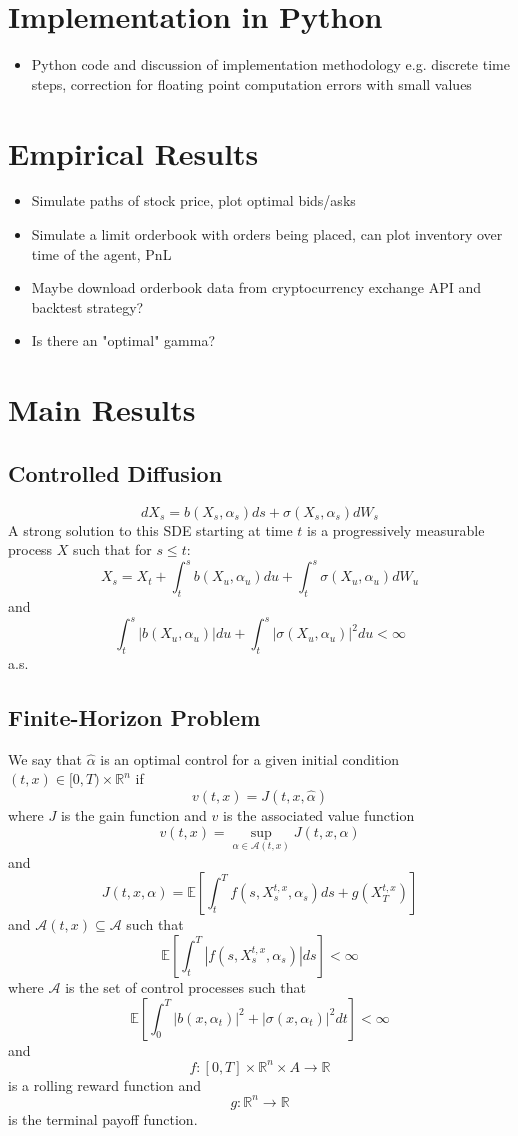 \documentclass{article}
\begin{document}
\section{Implementation in Python}
\begin{itemize}
    \item Python code and discussion of implementation methodology e.g. discrete time steps, correction for floating point computation errors with small values
\end{itemize}
\section{Empirical Results}
\begin{itemize}
    \item Simulate paths of stock price, plot optimal bids/asks 
    \item Simulate a limit orderbook with orders being placed, can plot inventory over time of the agent, PnL
    \item Maybe download orderbook data from cryptocurrency exchange API and backtest strategy?
    \item Is there an "optimal" gamma?
\end{itemize}
\break
\section{Main Results}
\subsection{Controlled Diffusion}
$$dX_s=b(X_s,\alpha_s)ds+\sigma(X_s,\alpha_s)dW_s$$
A strong solution to this SDE starting at time $t$ is a progressively measurable process $X$ such that for $s\leq t$:
$$X_s=X_t+\int_{t}^{s}b(X_u,\alpha_u)du+\int_t^s\sigma(X_u,\alpha_u)dW_u$$
and
$$\int_t^s|b(X_u,\alpha_u)|du+\int_t^s|\sigma(X_u,\alpha_u)|^2du<\infty$$
a.s.
\subsection{Finite-Horizon Problem}
We say that $\hat{\alpha}$ is an optimal control for a given initial condition $(t,x)\in[0,T)\times\mathbb{R}^n$ if
$$v(t,x)=J(t,x,\hat{\alpha})$$
where $J$ is the gain function and $v$ is the associated value function
$$v(t,x)=\sup\limits_{\alpha\in\mathcal{A}(t,x)}J(t,x,\alpha)$$
and
$$J(t,x,\alpha)=\mathbb{E}\left[\int_t^Tf(s,X_s^{t,x},\alpha_s)ds+g(X_T^{t,x})\right]$$
and $\mathcal{A}(t,x)\subseteq\mathcal{A}$ such that
$$\mathbb{E}\left[\int_t^T|f(s,X_s^{t,x},\alpha_s)|ds\right]<\infty$$
where $\mathcal{A}$ is the set of control processes such that
$$\mathbb{E}\left[\int_0^T|b(x,\alpha_t)|^2+|\sigma(x,\alpha_t)|^2dt\right]<\infty$$
and
$$f:[0,T]\times\mathbb{R}^n\times A\rightarrow\mathbb{R}$$
is a rolling reward function and 
$$g:\mathbb{R}^n\rightarrow\mathbb{R}$$
is the terminal payoff function.
\end{document}
